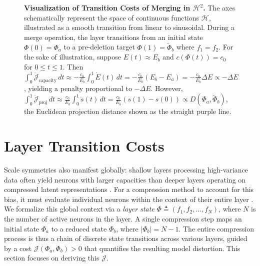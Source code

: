 \documentclass[11pt, a4paper, copyright, gdm]{google}
\newcommand{\calH}{\mathcal{H}}
\newcommand{\calJ}{\mathcal{J}}
\theoremstyle{definition}
\begin{document}
\begin{figure}[tb]
\begin{minipage}{0.50\textwidth}
{{
}
} %
\end{minipage}\hfill %
\begin{minipage}{0.50\textwidth}
\caption{\textbf{Visualization of Transition Costs of Merging in $\calH^2$.} The axes schematically represent the space of continuous functions $\calH$, illustrated as a smooth transition from linear to sinusoidal. During a merge operation, the layer transitions from an initial state $\Phi(0)=\Phi_a$ to a pre-deletion target $\Phi(1)=\tilde{\Phi}_b$ where $f_1 = f_2$. For the sake of illustration, suppose $E(t)\approx E_b$ and $c(\Phi(t))=c_0$ for $0 \leq t \leq 1$. Then $\int_0^1 \dot{\calJ}_{\text{capacity}} \,dt \approx -\frac{c_0}{E_b} \int_0^1 \dot{E}(t) \,dt = -\frac{c_0}{E_b}(E_b - E_a) = -\frac{c_0}{E_b} \Delta E \propto -\Delta E$, yielding a penalty proportional to $-\Delta E$. However, $\int_0^1 \dot{\calJ}_{\text{proj}} \,dt \approx \frac{c_0}{E_b} \int_0^1 \dot{s}(t) \,dt = \frac{c_0}{E_b}(s(1)-s(0)) \propto D(\Phi_a,\tilde{\Phi}_b)$, the Euclidean projection distance shown as the straight purple line.}

\label{fig:tuple_projection}
\end{minipage}
\end{figure}


\section{Layer Transition Costs}
\label{sec:layer_transition_costs}
Scale symmetries also manifest globally: shallow layers processing high-variance data often yield neurons with larger capacities than deeper layers operating on compressed latent representations \cite{hanin2018start, Tanaka2020PruningNN}. For a compression method to account for this bias, it must evaluate individual neurons within the context of their entire layer \cite{lee2021layer}. We formalize this global context via a \textit{layer state} $\Phi \triangleq (f_1, f_2, \dots, f_{N})$, where $N$ is the number of active neurons in the layer. A single compression step maps an initial state $\Phi_a$ to a reduced state $\Phi_b$, where $|\Phi_b|=N-1$. The entire compression process is thus a chain of discrete state transitions across various layers, guided by a cost $\calJ(\Phi_a, \Phi_b) > 0$ that quantifies the resulting model distortion. This section focuses on deriving this $\calJ$.
\end{document}
